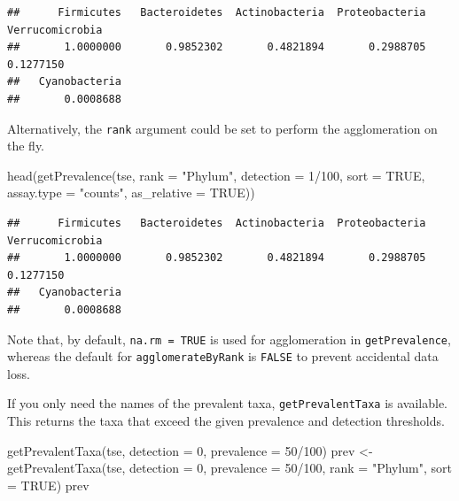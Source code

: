 \documentclass[
]{book}
\newenvironment{Shaded}{\begin{snugshade}}{\end{snugshade}}
\newcommand{\AttributeTok}[1]{\textcolor[rgb]{0.77,0.63,0.00}{#1}}
\newcommand{\ConstantTok}[1]{\textcolor[rgb]{0.00,0.00,0.00}{#1}}
\newcommand{\DecValTok}[1]{\textcolor[rgb]{0.00,0.00,0.81}{#1}}
\newcommand{\FunctionTok}[1]{\textcolor[rgb]{0.00,0.00,0.00}{#1}}
\newcommand{\NormalTok}[1]{#1}
\newcommand{\OtherTok}[1]{\textcolor[rgb]{0.56,0.35,0.01}{#1}}
\newcommand{\SpecialCharTok}[1]{\textcolor[rgb]{0.00,0.00,0.00}{#1}}
\newcommand{\StringTok}[1]{\textcolor[rgb]{0.31,0.60,0.02}{#1}}
\begin{document}
\begin{verbatim}
##      Firmicutes   Bacteroidetes  Actinobacteria  Proteobacteria Verrucomicrobia 
##       1.0000000       0.9852302       0.4821894       0.2988705       0.1277150 
##   Cyanobacteria 
##       0.0008688
\end{verbatim}

Alternatively, the \texttt{rank} argument could be set to perform the
agglomeration on the fly.

\begin{Shaded}
\begin{Highlighting}[]
\FunctionTok{head}\NormalTok{(}\FunctionTok{getPrevalence}\NormalTok{(tse, }\AttributeTok{rank =} \StringTok{"Phylum"}\NormalTok{, }\AttributeTok{detection =} \DecValTok{1}\SpecialCharTok{/}\DecValTok{100}\NormalTok{, }\AttributeTok{sort =} \ConstantTok{TRUE}\NormalTok{,}
                   \AttributeTok{assay.type =} \StringTok{"counts"}\NormalTok{, }\AttributeTok{as\_relative =} \ConstantTok{TRUE}\NormalTok{))}
\end{Highlighting}
\end{Shaded}

\begin{verbatim}
##      Firmicutes   Bacteroidetes  Actinobacteria  Proteobacteria Verrucomicrobia 
##       1.0000000       0.9852302       0.4821894       0.2988705       0.1277150 
##   Cyanobacteria 
##       0.0008688
\end{verbatim}

Note that, by default, \texttt{na.rm\ =\ TRUE} is used for agglomeration in
\texttt{getPrevalence}, whereas the default for \texttt{agglomerateByRank} is
\texttt{FALSE} to prevent accidental data loss.

If you only need the names of the prevalent taxa, \texttt{getPrevalentTaxa}
is available. This returns the taxa that exceed the given prevalence
and detection thresholds.

\begin{Shaded}
\begin{Highlighting}[]
\FunctionTok{getPrevalentTaxa}\NormalTok{(tse, }\AttributeTok{detection =} \DecValTok{0}\NormalTok{, }\AttributeTok{prevalence =} \DecValTok{50}\SpecialCharTok{/}\DecValTok{100}\NormalTok{)}
\NormalTok{prev }\OtherTok{\textless{}{-}} \FunctionTok{getPrevalentTaxa}\NormalTok{(tse, }\AttributeTok{detection =} \DecValTok{0}\NormalTok{, }\AttributeTok{prevalence =} \DecValTok{50}\SpecialCharTok{/}\DecValTok{100}\NormalTok{,}
                         \AttributeTok{rank =} \StringTok{"Phylum"}\NormalTok{, }\AttributeTok{sort =} \ConstantTok{TRUE}\NormalTok{)}
\NormalTok{prev}
\end{Highlighting}
\end{Shaded}
\end{document}
